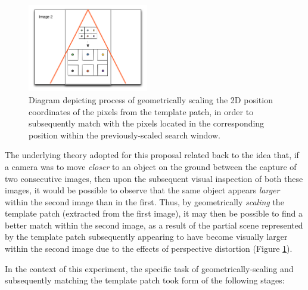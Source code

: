 \begin{figure}
  \begin{center}
    \includegraphics[width=0.47\textwidth]{images/scaling.png}
  \end{center}
  \vspace{-10pt}
  \caption{Diagram depicting process of geometrically scaling the 2D position coordinates of the pixels from the template patch, in order to subsequently match with the pixels located in the corresponding position within the previously-scaled search window.}
  \label{fig:scaled}
  \vspace{-10pt}
\end{figure}

The underlying theory adopted for this proposal related back to the idea that, if a camera was to move \textit{closer} to an object on the ground between the capture of two consecutive images, then upon the subsequent visual inspection of both these images, it would be possible to observe that the same object appears \textit{larger} within the second image than in the first. Thus, by geometrically \textit{scaling} the template patch (extracted from the first image), it may then be possible to find a better match within the second image, as a result of the partial scene represented by the template patch subsequently appearing to have become visually larger within the second image due to the effects of perspective distortion (Figure \ref{fig:scaled}).

In the context of this experiment, the specific task of geometrically-scaling and subsequently matching the template patch took form of the following stages:

